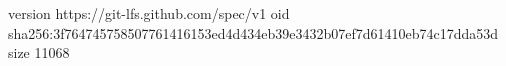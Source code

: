 version https://git-lfs.github.com/spec/v1
oid sha256:3f764745758507761416153ed4d434eb39e3432b07ef7d61410eb74c17dda53d
size 11068
